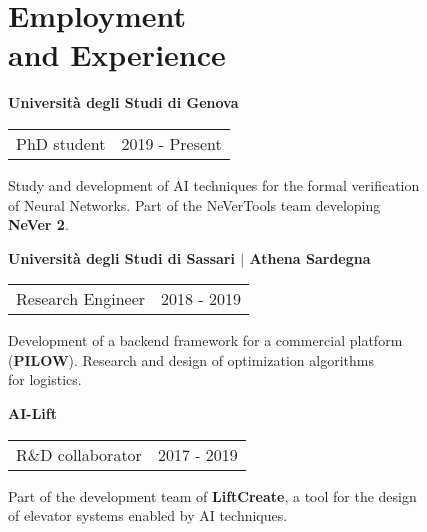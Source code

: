 \section{\sc Employment \\and Experience}
{\bf{Universit\`a degli Studi di Genova}}\\
\begin{tabular}{@{}p{4in}p{2in}}
	PhD student & 2019 - Present\\
\end{tabular}
Study and development of AI techniques for the formal verification\\
of Neural Networks. Part of the NeVerTools team developing\\
\textbf{NeVer 2}.

{\bf{Universit\`a degli Studi di Sassari $\vert$ Athena Sardegna}}\\
\begin{tabular}{@{}p{4in}p{2in}}
	Research Engineer & 2018 - 2019\\
\end{tabular}
Development of a backend framework for a commercial platform\\
(\textbf{PILOW}). Research and design of optimization algorithms\\
for logistics.

{\bf{AI-Lift}}\\
\begin{tabular}{@{}p{4in}p{2in}}
	R\&D collaborator  & 2017 - 2019\\
\end{tabular}
Part of the development team of \textbf{LiftCreate}, a tool for the design\\
of elevator systems enabled by AI techniques.
